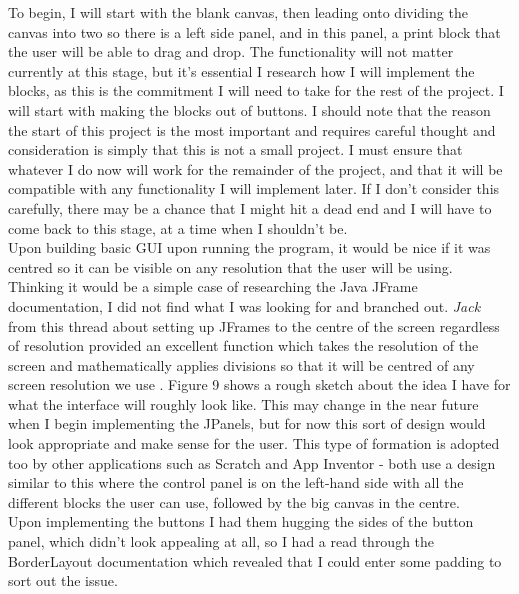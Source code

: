 \documentclass[a4paper, 12pt]{article}
\begin{document}
            To begin, I will start with the blank canvas, then leading onto dividing the canvas into two
            so there is a left side panel, and in this panel, a print block that the user will be able
            to drag and drop. The functionality will not matter currently at this stage, but it's
            essential I research how I will implement the blocks, as this is the commitment I will need
            to take for the rest of the project. I will start with making the blocks out of buttons.
            I should note that the reason the start of this project is the most important and requires
            careful thought and consideration is simply that this is not a small project. I must
            ensure that whatever I do now will work for the remainder of the project, and that it will
            be compatible with any functionality I will implement later. If I don't consider this
            carefully, there may be a chance that I might hit a dead end and I will have to come back
            to this stage, at a time when I shouldn't be. \\

            Upon building basic GUI upon running the program, it would be nice if it was centred so it
            can be visible on any resolution that the user will be using. Thinking it would be a simple
            case of researching the Java JFrame documentation, I did not find what I was looking for and
            branched out. \textit{Jack} from this thread about setting up JFrames to the centre of the
            screen regardless of resolution provided an excellent function which takes the resolution of
            the screen and mathematically applies divisions so that it will be centred of any screen
            resolution we use \cite{jackSO}. Figure 9 shows a rough sketch about the idea I have for what the interface will roughly look
            like. This may change in the near future when I begin implementing the JPanels, but for now
            this sort of design would look appropriate and make sense for the user. This type of formation
            is adopted too by other applications such as Scratch and App Inventor - both use a design
            similar to this where the control panel is on the left-hand side with all the different
            blocks the user can use, followed by the big canvas in the centre. \\


            Upon implementing the buttons I had them hugging the sides of the button panel, which didn't
            look appealing at all, so I had a read through the BorderLayout documentation which revealed
            that I could enter some padding to sort out the issue.
\end{document}
